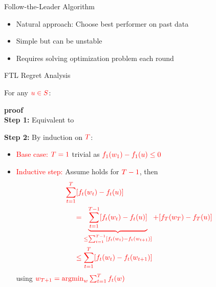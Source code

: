 \documentclass[handout]{beamer}
\begin{document}
\begin{small}
\begin{frame}{Follow-the-Leader Algorithm}
\begin{itemize}
\item Natural approach: Choose best performer on past data
\item Simple but can be unstable
\item Requires solving optimization problem each round
\end{itemize}
\end{frame}

\begin{frame}{FTL Regret Analysis}
\begin{theorem}[Lemma 2.1]
  For any $\textcolor{red}{u \in S}$:
  \R{\[
    \text{Regret}_T(\mathbf{u}) = \sum_{t=1}^{T} \left(f_t(\mathbf{w}_t) - f_t(\mathbf{u})\right) \leq \sum_{t=1}^{T} \left(f_t(\mathbf{w}_t) - f_t(\mathbf{w}_{t+1})\right).
  \]}
\end{theorem}
{\bf proof} \\
{\bf Step 1:} Equivalent to
\end{frame}

\begin{frame}

{\bf Step 2:} By induction on $\textcolor{red}{T}$:
\begin{itemize}
\item \textcolor{red}{Base case:} $\textcolor{red}{T=1}$ trivial as $\textcolor{red}{f_1(w_1) - f_1(u) \leq 0}$

\item \textcolor{red}{Inductive step:} Assume holds for $\textcolor{red}{T-1}$, then
\begin{align*}
\textcolor{red}{\sum_{t=1}^T} &\textcolor{red}{[f_t(w_t) - f_t(u)]} \\
&\textcolor{red}{= \underbrace{\sum_{t=1}^{T-1} [f_t(w_t) - f_t(u)]}_{\leq \sum_{t=1}^{T-1} [f_t(w_t) - f_t(w_{t+1})]} + [f_T(w_T) - f_T(u)]} \\
&\textcolor{red}{\leq \sum_{t=1}^T [f_t(w_t) - f_t(w_{t+1})]}
\end{align*}
using $\textcolor{red}{w_{T+1} = \operatorname{argmin}_w \sum_{t=1}^T f_t(w)}$
\end{itemize}
\end{frame}


\end{small}
\end{document}
